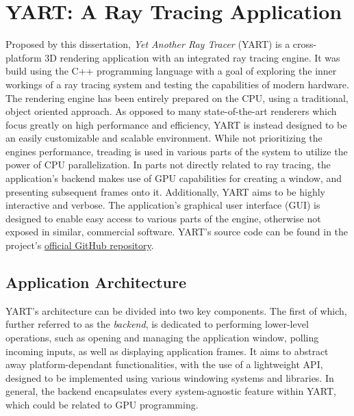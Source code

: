 
\chapter{YART: A Ray Tracing Application} \label{ch:Application}

Proposed by this dissertation, \textit{Yet Another Ray Tracer} (YART) is a cross-platform 3D rendering application with an integrated ray tracing engine. 
It was build using the C++ programming language with a goal of exploring the inner workings of a ray tracing system and testing the capabilities of modern hardware.
The rendering engine has been entirely prepared on the CPU, using a traditional, object oriented approach.
As opposed to many state-of-the-art renderers which focus greatly on high performance and efficiency, YART is instead designed to be an easily customizable and scalable environment. 
While not prioritizing the engines performance, treading is used in various parts of the system to utilize the power of CPU parallelization.
In parts not directly related to ray tracing, the application's backend makes use of GPU capabilities for creating a window, and presenting subsequent frames onto it.
Additionally, YART aims to be highly interactive and verbose.
The application's graphical user interface (GUI) is designed to enable easy access to various parts of the engine, otherwise not exposed in similar, commercial software. 
YART's source code can be found in the project's \href{https://github.com/hhimko/yart}{official GitHub repository}. 

\section{Application Architecture}

YART's architecture can be divided into two key components.
The first of which, further referred to as the \textit{backend}, is dedicated to performing lower-level operations, such as opening and managing the application window, polling incoming inputs, as well as displaying application frames. 
It aims to abstract away platform-dependant functionalities, with the use of a lightweight API, designed to be implemented using various windowing systems and libraries. 
In general, the backend encapsulates every system-agnostic feature within YART, which could be related to GPU programming.

